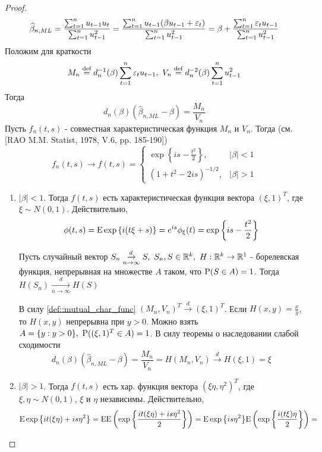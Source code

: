 \begin{proof}
    \[\widehat{\beta}_{n,ML}=\frac{\sum_{t=1}^nu_{t-1}u_t}{\sum_{t=1}^nu_{t-1}^2}=\frac{\sum_{t=1}^nu_{t-1}(\beta u_{t-1}+\eps_t)}{\sum_{t=1}^nu_{t-1}^2}=\beta+\frac{\sum_{t=1}^n\eps_tu_{t-1}}{\sum_{t=1}^nu_{t-1}^2}\]
    Положим для краткости
    \[M_n\defeq d^{-1}_n(\beta)\sum_{t=1}^n\eps_tu_{t-1},\ V_n\defeq d^{-2}_n(\beta)\sum_{t=1}^nu^2_{t-1}\]
    Тогда 
    \[d_n(\beta)(\widehat{\beta}_{n,ML}-\beta)=\frac{M_n}{V_n}\]
    Пусть $f_n(t,s)$ - совместная характеристическая функция $M_n$ и $V_n$.
    Тогда (см. [RAO M.M. Statist, 1978, V.6, pp. 185-190])
    \begin{equation}\label{def::mutual_char_func}
        f_n(t,s)\rightarrow f(t,s)=\begin{cases}
            \exp{\left\{is-\frac{t^2}{2}\right\}},& \left\lvert \beta\right\rvert <1 \\
            (1+t^2-2is)^{-1/2},& \left\lvert \beta\right\rvert >1
        \end{cases}
    \end{equation}
    \begin{enumerate}
        \item \underline{$\left\lvert \beta\right\rvert <1$}. Тогда $f(t,s)$ есть характеристическая
        функция вектора $(\xi,1)^T$, где $\xi\sim N(0,1)$. Действительно,
        \[\phi(t,s)=\E\exp{\left\{i(t\xi+s)\right\}}=e^{is}\phi_\xi(t)=\exp{\left\{is-\frac{t^2}{2}\right\}}\]
        \begin{theorem*}
            Пусть случайный вектор $S_n\underset{n\rightarrow\infty}{\xrightarrow{d}}S,\ S_n,S\in\R^k,\ H:\R^k\rightarrow \R^1$ - 
            борелевская функция, непрерывная на множестве $A$ таком, что $\P(S\in A)=1$. Тогда $H(S_n)\underset{n\rightarrow\infty}{\xrightarrow{d}}H(S)$
        \end{theorem*}
        В силу \eqref{def::mutual_char_func} $(M_n,V_n)^T\xrightarrow{d}(\xi,1)^T$.
        Если $H(x,y)=\frac{x}{y}$, то $H(x,y)$  непрерывна при $y>0$.  Можно взять
        $A=\{y:y>0\},\ \P((\xi,1)^T\in A)=1$. В силу теоремы о наследовании
        слабой сходимости
        \[d_n(\beta)(\widehat{\beta}_{n,ML}-\beta)=\frac{M_n}{V_n}=H(M_n, V_n)\xrightarrow{d}H(\xi,1)=\xi\] 
        \item \underline{$\left\lvert \beta\right\rvert >1$}. Тогда $f(t,s)$ есть хар. функция 
        вектора $(\xi\eta,\eta^2)^T$, где $\xi,\eta\sim N(0,1)$, $\xi$ и $\eta$
        независимы. Действительно,
        \[\E\exp{\left\{it(\xi\eta)+is\eta^2\right\}}=\E\E\left(\exp{\left\{\frac{it(\xi\eta)+is\eta^2}{2}\right\}}\right)=\E\exp{\left\{is\eta^2\right\}}\E\left(\exp{\left\{\frac{i(t\xi)\eta}{2}\right\}}\right)=\]

\end{enumerate}
\end{proof}
